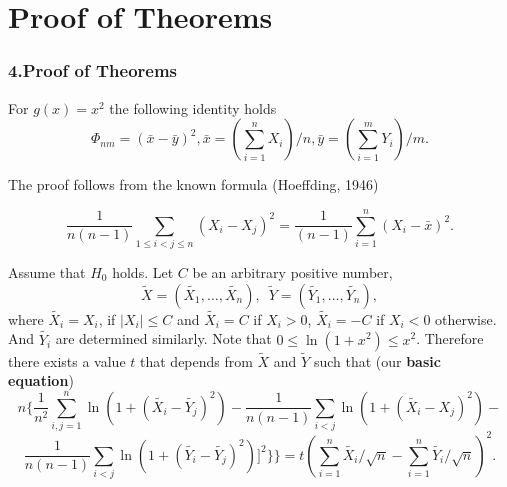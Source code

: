 \documentclass[slidestop,usepdftitle=false]{beamer}
\begin{document}
\section{Proof of Theorems}
\begin {slide}
\frametitle{4.Proof of Theorems}


\begin{lemma} For $g(x)= x^2$ the following identity holds
$$
\Phi_{nm}= (\bar x - \bar y)^2,
\bar x = (\sum_{i=1}^n X_i)/n,
\bar y = (\sum_{i=1}^m Y_i)/m.
$$
\end{lemma}

The proof follows from the known formula (Hoeffding, 1946)


$$
\frac {1}{n(n-1)}\sum_{1\leq i<j\leq n
} (X_i-X_j)^2=\frac {1}{(n-1)} \sum_{i=1}^n (X_i - \bar x)^2.
$$

\end{slide}



\begin{slide}
Assume that $H_0$ holds. Let  $C$ be an arbitrary positive number,
$$
\tilde{X}=(\tilde{X_{1}},\ldots,\tilde{X_{n}}),\,\,\,
\tilde{Y}=(\tilde{Y_{1}},\ldots, \tilde{Y_{n}}),
$$
where $\tilde{X_{i}}=X_{i}$, if $
|X_{i}| \leq C$ and
 $\tilde{X_i}=C$ if $X_{i}>0$,
  $\tilde{X_i}=-C$ if $X_{i}<0$ otherwise. And $\tilde{Y_{i}}$ are determined similarly. Note that  $0 \leq \ln (1+x^2) \leq x^2$. Therefore there exists a value $t$ that depends from $\tilde{X}$ and $\tilde{Y}$ such that (our {\bf basic equation})
\begin{equation*}
n\{\frac{1}{n^2}\sum_{i,j=1}^n \ln(1 + (\tilde{X_{i}} - \tilde{Y_{j}})^2)-\frac{1}{n(n-1)}\sum_{i<j} \ln(1 + (\tilde{X_{i}} - X_j)^2) -
\end{equation*}
\begin{equation*}
 \frac{1}{n(n-1)}\sum_{i<j}  \ln(1 + (\tilde{Y_{i}} - \tilde{Y_{j}})^2)]^2\}\}=
t
(\sum_{i=1}^n \tilde{X_{i}}/\sqrt{n}-\sum_{i=1}^n \tilde{Y_{i}}/\sqrt{n})^2.
\end{equation*}

 \end{slide}
\end{document}
